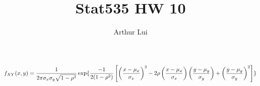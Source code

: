 \documentclass{article}
\begin{document}
\title{Stat535 HW 10}
\author{Arthur Lui}
\maketitle

\[
  f_{XY}(x,y) = \frac{1}{2\pi\sigma_x\sigma_y\sqrt{1-\rho^2}}
                \exp\{\frac{-1}{2(1-\rho^2)}
                \left[
                  \left(\frac{x-\mu_x}{\sigma_x}\right)^2 - 
                  2\rho
                  \left(\frac{x-\mu_x}{\sigma_x}\right)
                  \left(\frac{y-\mu_y}{\sigma_y}\right)   +
                  \left(\frac{y-\mu_y}{\sigma_y}\right)^2 
                \right]\}\\
\]
\end{document}
